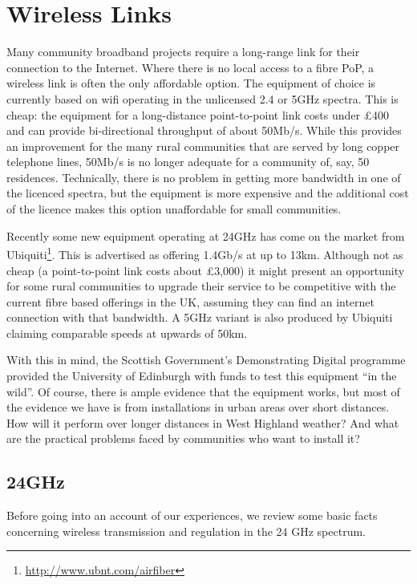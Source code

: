 \documentclass{amsart}
\begin{document}
\section{Wireless Links}\label{introduction}
Many community broadband projects require a long-range link
for their connection to the Internet. Where there is no local access
to a fibre PoP, a wireless link is often the only affordable option.
The equipment of choice is
currently based on wifi operating in the unlicensed 2.4 or 5GHz
spectra. This is cheap: the equipment for a long-distance
point-to-point link costs under \pounds 400 and can provide
bi-directional throughput of about 50Mb/s. While this provides an
improvement for the many rural communities that are served by long
copper telephone lines, 50Mb/s is no longer adequate for a community
of, say, 50 residences. Technically, there is no problem in getting
more bandwidth in one of the licenced spectra, but the equipment is
more expensive and the additional cost of the licence makes this
option unaffordable for small communities.

Recently some new equipment operating at 24GHz has come on the market
from Ubiquiti\footnote{\href{http://www.ubnt.com/airfiber}{\url{http://www.ubnt.com/airfiber}}}.
This is advertised as offering 1.4Gb/s at up to 13km. Although not as
cheap (a point-to-point link costs about \pounds 3,000) it might present
an opportunity for some rural communities to upgrade their service to
be competitive with the current fibre based offerings in the UK,
assuming they can find an internet connection with that bandwidth. A
5GHz variant is also produced by Ubiquiti claiming comparable speeds
at upwards of 50km.

With this in mind, the Scottish Government's Demonstrating
Digital programme provided the University of Edinburgh with funds to
test this equipment ``in the wild''. Of course, there is ample evidence
that the equipment works, but most of the evidence we have is
from installations in urban areas over short distances. How will
it perform over longer distances in West Highland weather? And what
are the practical problems faced by communities who want to install it?

\subsection{24GHz}\label{background}

Before going into an account of our experiences, we review some
basic facts concerning wireless transmission and regulation in the 24
GHz spectrum. 
\end{document}
